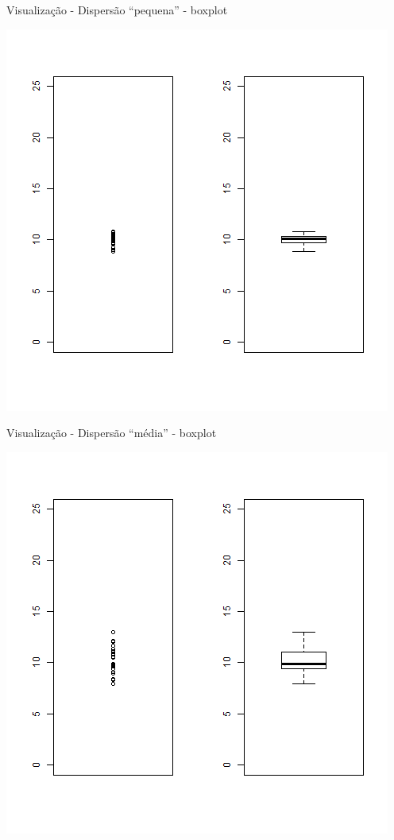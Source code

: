 \documentclass{beamer}
\begin{document}
\begin{frame}{\small Visualização - Dispersão ``pequena'' - boxplot}
  \begin{center}
    \includegraphics[height=.8\textheight]{Cap17/dot-box-P}
  \end{center}
\end{frame}

\begin{frame}{\small Visualização - Dispersão ``média'' - boxplot}
  \begin{center}
    \includegraphics[height=.8\textheight]{Cap17/dot-box-M}
  \end{center}
\end{frame}
\end{document}
